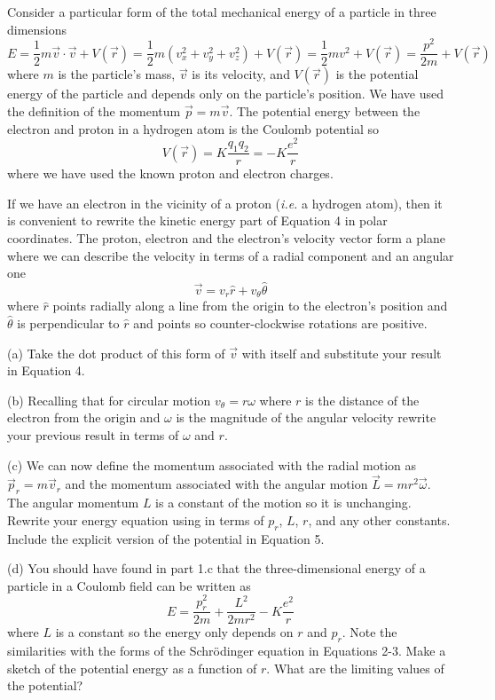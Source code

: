 Consider a particular form of the total
mechanical energy of a particle in three dimensions
\begin{equation}
E = \frac{1}{2} m \vec v \cdot \vec v + V(\vec r) = 
   \frac{1}{2} m (v_x^2 + v_y^2 + v_z^2) + V(\vec r) = 
   \frac{1}{2} m v^2 + V(\vec r) =
   \frac{p^2}{2m} + V(\vec r)
\end{equation}
where $m$ is the particle's mass, $\vec v$ is its
velocity, and  $V(\vec r)$ is the potential energy of the particle
and depends only on the particle's position.
We have used the definition of the momentum $\vec p = m \vec v$.
The potential energy between the electron and proton in a hydrogen atom is 
the Coulomb potential so
\begin{equation}
V(\vec r) = K \frac{q_1 q_2}{r} =  
   - K \frac{e^2}{r} 
\end{equation}
where we have used the known proton and electron charges.

If we have an electron in the vicinity of a proton ({\it i.e.} a hydrogen atom), then
it is convenient to rewrite the kinetic energy part of Equation 4 in polar coordinates.
The proton, electron and the electron's velocity vector 
form a plane where we can describe the velocity in terms
of a radial component and an angular one
\begin{equation}
\vec v = v_r \hat r + v_\theta \hat \theta
\end{equation}
where $\hat r$ points radially along a line from the origin to the electron's position
and $\hat \theta$ is perpendicular to $\hat r$ and points so counter-clockwise rotations
are positive.

(a) Take the dot product of this form of $\vec v$ with itself
and substitute your result in Equation 4.
\vskip 2.0cm

(b) Recalling that for circular motion
$v_\theta = r \omega$ where $r$ is the distance of the electron from
the origin and $\omega$ is the magnitude of the angular velocity rewrite 
your previous result in terms of $\omega$ and $r$.
\vskip 2.0cm

(c) We can now define the momentum associated with  the radial motion
as $\vec p_r = m\vec v_r$
and the momentum associated with the angular motion $\vec L = mr^2\vec \omega$.
The angular momentum $L$ is a constant of the motion so it is unchanging.
Rewrite your energy equation using in terms of $p_r$, $L$, $r$, and any other constants.
Include the explicit version of the potential in Equation 5.
\vskip 2.0cm

(d) You should have found in part 1.c that the three-dimensional
energy of a particle in a Coulomb field can be written as
\begin{equation}
E = \frac{p_r^2}{2m} + \frac{L^2}{2mr^2} - K\frac{e^2}{r}
\end{equation}
where $L$ is a constant so the energy only depends on $r$ and $p_r$.
Note the similarities with the forms of the Schr\"odinger equation in Equations 2-3.
Make a sketch of the potential energy as a function of $r$.
What are the limiting values of the potential?
\vskip 3.0cm

